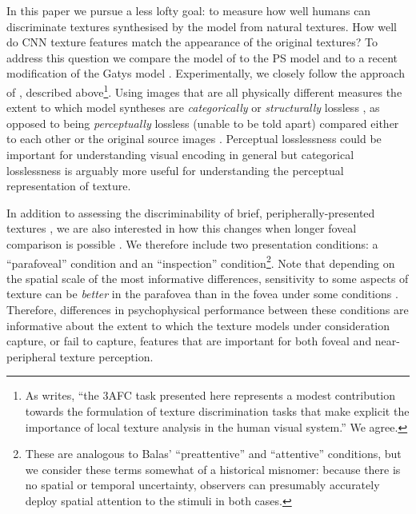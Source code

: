 \documentclass[doc, 11pt,a4paper,natbib]{apa6}\usepackage[]{graphicx}\usepackage[]{color}
\begin{document}
In this paper we pursue a less lofty goal: to measure how well humans can discriminate textures synthesised by the \citet{gatys_texture_2015-1} model from natural textures.
How well do CNN texture features match the appearance of the original textures?
To address this question we compare the model of \citet{gatys_texture_2015-1} to the PS model \citep{portilla_parametric_2000} and to a recent modification of the Gatys model \citep{liu_texture_2016}.
Experimentally, we closely follow the approach of \citet{balas_texture_2006}, described above\footnote{As \citet{balas_texture_2006} writes, ``the 3AFC task presented here represents a modest contribution towards the formulation of texture discrimination tasks that make explicit the importance of local texture analysis in the human visual system.'' We agree.}.
Using images that are all physically different measures the extent to which model syntheses are \textit{categorically} or \textit{structurally} lossless \citep[in that they could both be considered samples from original images;][]{pappas_rough_2013}, as opposed to being \textit{perceptually} lossless (unable to be told apart) compared either to each other \citep{freeman_metamers_2011} or the original source images \citep{wallis_testing_2016}.
Perceptual losslessness could be important for understanding visual encoding in general but categorical losslessness is arguably more useful for understanding the perceptual representation of texture.

In addition to assessing the discriminability of brief, peripherally-presented textures \citep[as in][]{balas_texture_2006}, we are also interested in how this changes when longer foveal comparison is possible \citep[as in][]{balas_contrast_2012}.
We therefore include two presentation conditions: a ``parafoveal'' condition and an ``inspection'' condition\footnote{
These are analogous to Balas' ``preattentive'' and ``attentive'' conditions, but we consider these terms somewhat of a historical misnomer: because there is no spatial or temporal uncertainty, observers can presumably accurately deploy spatial attention to the stimuli in both cases.
}.
Note that depending on the spatial scale of the most informative differences, sensitivity to some aspects of texture can be \textit{better} in the parafovea than in the fovea under some conditions \citep{gurnsey_texture_1996,kehrer_perceptual_1987,kehrer_central_1989}. 
Therefore, differences in psychophysical performance between these conditions are informative about the extent to which the texture models under consideration capture, or fail to capture, features that are important for both foveal and near-peripheral texture perception.
\end{document}
